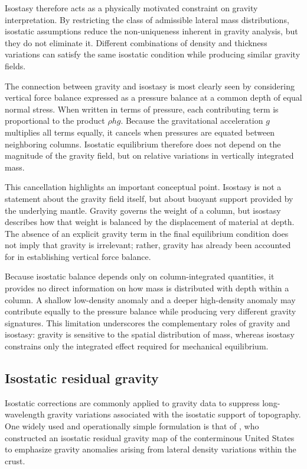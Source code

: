 Isostasy therefore acts as a physically motivated constraint on gravity interpretation.  By restricting the class of admissible lateral mass distributions, isostatic assumptions reduce the non-uniqueness inherent in gravity analysis, but they do not eliminate it.  Different combinations of density and thickness variations can satisfy the same isostatic condition while producing similar gravity fields.

The connection between gravity and isostasy is most clearly seen by considering vertical force balance expressed as a pressure balance at a common depth of equal normal stress.  When written in terms of pressure, each contributing term is proportional to the product $\rho h g$.  Because the gravitational acceleration $g$ multiplies all terms equally, it cancels when pressures are equated between neighboring columns.  Isostatic equilibrium therefore does not depend on the magnitude of the gravity field, but on relative variations in vertically integrated mass.

This cancellation highlights an important conceptual point.  Isostasy is not a statement about the gravity field itself, but about buoyant support provided by the underlying mantle.  Gravity governs the weight of a column, but isostasy describes how that weight is balanced by the displacement of material at depth.  The absence of an explicit gravity term in the final equilibrium condition does not imply that gravity is irrelevant; rather, gravity has already been accounted for in establishing vertical force balance.

Because isostatic balance depends only on column-integrated quantities, it provides no direct information on how mass is distributed with depth within a column.  A shallow low-density anomaly and a deeper high-density anomaly may contribute equally to the pressure balance while producing very different gravity signatures.  This limitation underscores the complementary roles of gravity and isostasy: gravity is sensitive to the spatial distribution of mass, whereas isostasy constrains only the integrated effect required for mechanical equilibrium.

\subsection{Isostatic residual gravity}\label{sec:isostatic_residual}

Isostatic corrections are commonly applied to gravity data to suppress long-wavelength gravity variations associated with the isostatic support of topography. One widely used and operationally simple formulation is that of \citet{Simpson_etal1986}, who constructed an isostatic residual gravity map of the conterminous United States to emphasize gravity anomalies arising from lateral density variations within the crust.

